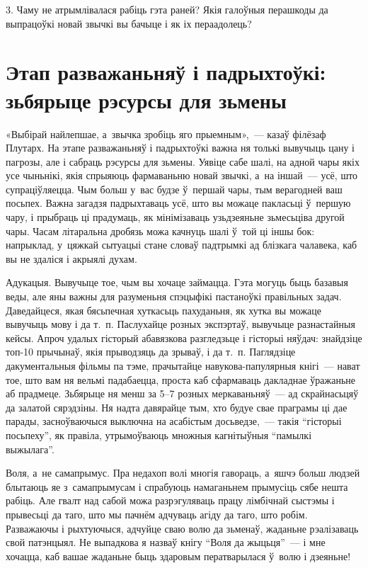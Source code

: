 3. Чаму не атрымлівалася рабіць гэта раней? Якія галоўныя перашкоды да выпрацоўкі новай звычкі вы бачыце і як іх пераадолець?


\section{Этап разважаньняў і падрыхтоўкі: зьбярыце рэсурсы для зьмены}

«Выбірай найлепшае, а~звычка зробіць яго прыемным»,~--- казаў філёзаф Плутарх. На этапе разважаньняў і падрыхтоўкі важна ня толькі вывучыць цану і пагрозы, але і сабраць рэсурсы для зьмены. Уявіце сабе шалі, на адной чары якіх усе чыньнікі, якія спрыяюць фармаваньню новай звычкі, а~на іншай~--- усё, што супраціўляецца. Чым больш у~вас будзе ў~першай чары, тым верагодней ваш посьпех. Важна загадзя падрыхтаваць усё, што вы можаце пакласьці ў~першую чару, і прыбраць ці прадумаць, як мінімізаваць узьдзеяньне зьмесьціва другой чары. Часам літаральна дробязь можа качнуць шалі ў~той ці іншы бок: напрыклад, у~цяжкай сытуацыі стане словаў падтрымкі ад блізкага чалавека, каб вы не здаліся і акрыялі духам.

Адукацыя. Вывучыце тое, чым вы хочаце займацца. Гэта могуць быць базавыя веды, але яны важны для разуменьня спэцыфікі пастаноўкі правільных задач. Даведайцеся, якая бясьпечная хуткасьць пахуданьня, як хутка вы можаце вывучыць мову і да т.~п. Паслухайце розных экспэртаў, вывучыце разнастайныя кейсы. Апроч удалых гісторый абавязкова разгледзьце і гісторыі няўдач: знайдзіце топ-10 прычынаў, якія прыводзяць да зрываў, і да т.~п. Паглядзіце дакументальныя фільмы па тэме, прачытайце навукова-папулярныя кнігі~--- нават тое, што вам ня вельмі падабаецца, проста каб сфармаваць дакладнае ўражаньне аб прадмеце. Зьбярыце ня менш за 5--7 розных меркаваньняў~--- ад скрайнасьцяў да залатой сярэдзіны. Ня надта давярайце тым, хто будуе свае праграмы ці дае парады, засноўваючыся выключна на асабістым досьведзе,~--- такія ``гісторыі посьпеху'', як правіла, утрымоўваюць множныя кагнітыўныя ``памылкі выжылага''.

Воля, а~не самапрымус. Пра недахоп волі многія гавораць, а~яшчэ больш людзей блытаюць яе з~самапрымусам і спрабуюць намаганьнем прымусіць сябе нешта рабіць. Але гвалт над сабой можа разрэгуляваць працу лімбічнай сыстэмы і прывесьці да таго, што мы пачнём адчуваць агіду да таго, што робім. Разважаючы і рыхтуючыся, адчуйце сваю волю да зьменаў, жаданьне рэалізаваць свой патэнцыял. Не выпадкова я назваў кнігу ``Воля да жыцьця''~--- і мне хочацца, каб вашае жаданьне быць здаровым ператварылася ў~волю і дзеяньне!

